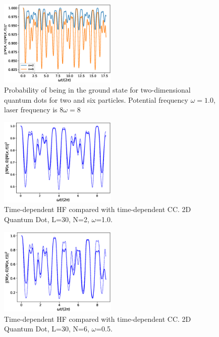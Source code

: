 \documentclass[aip,jcp,reprint,floatfix]{revtex4-1}
\begin{document}
        \begin{figure}
            \centering
            \includegraphics[width=0.5\textwidth]{./figures/2Domega10.eps}
            \caption{Probability of being in the ground state for two-dimensional
            quantum dots for two and six particles. 
            Potential frequency $\omega=1.0$, laser frequency is $8\omega = 8$}
            \label{fig:2Doemga10}
        \end{figure}
        
        \begin{figure}
            \centering
            \includegraphics[width=0.5\textwidth]{./figures/hf_vs_cc_n2.eps}
            \caption{Time-dependent HF compared with time-dependent CC.
                2D Quantum Dot, L=30, N=2, $\omega$=1.0.
            }
            \label{fig:hf_vs_cc_n2.eps}
        \end{figure}
        
        \begin{figure}
            \centering
            \includegraphics[width=0.5\textwidth]{./figures/hf_vs_cc_n6.eps}
            \caption{Time-dependent HF compared with time-dependent CC.
                2D Quantum Dot, L=30, N=6, $\omega$=0.5.
            }
            \label{fig:hf_vs_cc_n6}
        \end{figure}
        
\end{document}

